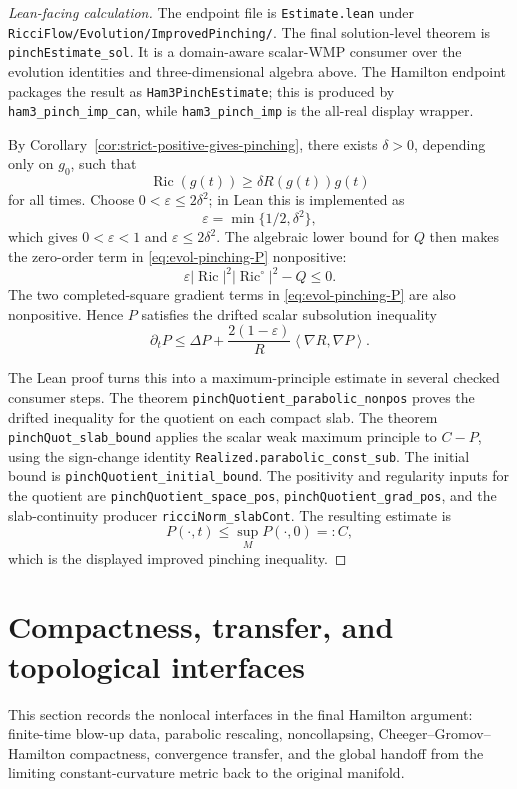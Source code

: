 \documentclass[11pt]{article}
\theoremstyle{plain}
\theoremstyle{definition}
\theoremstyle{remark}
\newcommand{\Ric}{\operatorname{Ric}}
\newcommand{\ip}[2]{\left\langle #1,#2\right\rangle}
\newcommand{\norm}[1]{\left|#1\right|}
\newcommand{\eps}{\varepsilon}
\newcommand{\del}{\delta}
\newcommand{\leanref}[1]{\nolinkurl{#1}}
\newcommand{\leanfile}[1]{\nolinkurl{#1}}
\newcommand{\rffile}[1]{\leanfile{#1}}
\newcommand{\rfdir}[1]{\leanfile{#1/}}
\begin{document}
\begin{proof}[Lean-facing calculation]
The endpoint file is \rffile{Estimate.lean} under
\rfdir{RicciFlow/Evolution/ImprovedPinching}.  The final solution-level theorem
is \leanref{pinchEstimate_sol}.  It is a domain-aware scalar-WMP consumer over
the evolution identities and three-dimensional algebra above.  The Hamilton
endpoint packages the result as \leanref{Ham3PinchEstimate}; this is produced
by \leanref{ham3_pinch_imp_can}, while \leanref{ham3_pinch_imp} is the
all-real display wrapper.

By Corollary~\ref{cor:strict-positive-gives-pinching}, there exists
\(\delta>0\), depending only on \(g_0\), such that
\[
\Ric(g(t))\ge\del R(g(t))g(t)
\]
for all times.  Choose \(0<\eps\le2\delta^2\); in Lean this is implemented as
\[
  \eps=\min\{1/2,\delta^2\},
\]
which gives \(0<\eps<1\) and \(\eps\le2\delta^2\).  The algebraic lower bound
for \(Q\) then makes the zero-order term in \eqref{eq:evol-pinching-P}
nonpositive:
\[
  \eps\norm{\Ric}^2\norm{\Ric^\circ}^2-Q\le0.
\]
The two completed-square gradient terms in \eqref{eq:evol-pinching-P} are also
nonpositive.  Hence \(P\) satisfies the drifted scalar subsolution inequality
\[
\partial_tP
\le
\Delta P+
\frac{2(1-\eps)}{R}\ip{\nabla R}{\nabla P}.
\]

The Lean proof turns this into a maximum-principle estimate in several checked
consumer steps.  The theorem \leanref{pinchQuotient_parabolic_nonpos} proves
the drifted inequality for the quotient on each compact slab.  The theorem
\leanref{pinchQuot_slab_bound} applies the scalar weak maximum principle to
\(C-P\), using the sign-change identity \leanref{Realized.parabolic_const_sub}.
The initial bound is \leanref{pinchQuotient_initial_bound}.  The positivity and
regularity inputs for the quotient are \leanref{pinchQuotient_space_pos},
\leanref{pinchQuotient_grad_pos}, and the slab-continuity producer
\leanref{ricciNorm_slabCont}.  The resulting estimate is
\[
  P(\cdot,t)\le \sup_M P(\cdot,0)=:C,
\]
which is the displayed improved pinching inequality.
\end{proof}

\section{Compactness, transfer, and topological interfaces}
\label{sec:global-interfaces}

This section records the nonlocal interfaces in the final Hamilton argument:
finite-time blow-up data, parabolic rescaling, noncollapsing,
Cheeger--Gromov--Hamilton compactness, convergence transfer, and the global
handoff from the limiting constant-curvature metric back to the original
manifold.
\end{document}
